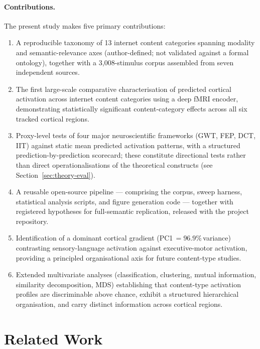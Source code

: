 \documentclass[11pt,letterpaper]{article}
\numberwithin{equation}{section}
\begin{document}
\paragraph{Contributions.} The present study makes five primary contributions:
\begin{enumerate}[leftmargin=1.4em,itemsep=2pt,topsep=2pt]
\item A reproducible taxonomy of 13 internet content categories spanning modality and semantic-relevance axes (author-defined; not validated against a formal ontology), together with a 3{,}008-stimulus corpus assembled from seven independent sources.
\item The first large-scale comparative characterisation of predicted cortical activation across internet content categories using a deep fMRI encoder, demonstrating statistically significant content-category effects across all six tracked cortical regions.
\item Proxy-level tests of four major neuroscientific frameworks (GWT, FEP, DCT, IIT) against static mean predicted activation patterns, with a structured prediction-by-prediction scorecard; these constitute directional tests rather than direct operationalisations of the theoretical constructs (see Section~\ref{sec:theory-eval}).
\item A reusable open-source pipeline --- comprising the corpus, sweep harness, statistical analysis scripts, and figure generation code --- together with registered hypotheses for full-semantic replication, released with the project repository.
\item Identification of a dominant cortical gradient (PC1\,$= 96.9\%$\,variance) contrasting sen\-sory-language activation against executive-motor activation, providing a principled organisational axis for future content-type studies.
\item Extended multivariate analyses (classification, clustering, mutual information, similarity decomposition, MDS) establishing that content-type activation profiles are discriminable above chance, exhibit a structured hierarchical organisation, and carry distinct information across cortical regions.
\end{enumerate}

\section{Related Work}
\end{document}
